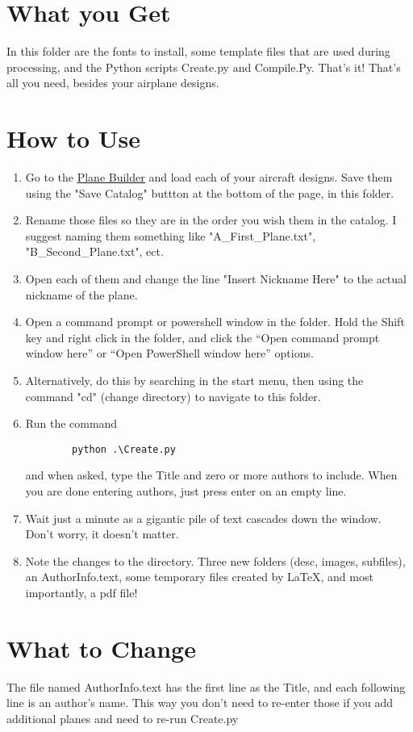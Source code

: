 \documentclass{article}
\begin{document}
\section{What you Get}
In this folder are the fonts to install, some template files that are used during processing, and the Python scripts Create.py and Compile.Py.  That's it!  That's all you need, besides your airplane designs.
\section{How to Use}
\begin{enumerate}
    \item Go to the \href{https://tetragramm.github.io/PlaneBuilder/index.html}{\color{blue}\underline{Plane Builder}} and load each of your aircraft designs.  Save them using the "Save Catalog" buttton at the bottom of the page, in this folder.
    \item Rename those files so they are in the order you wish them in the catalog.  I suggest naming them something like "A\_First\_Plane.txt", "B\_Second\_Plane.txt", ect.
    \item Open each of them and change the line "Insert Nickname Here" to the actual nickname of the plane.
    \item Open a command prompt or powershell window in the folder.  Hold the Shift key and right click in the folder, and click the ``Open command prompt window here'' or ``Open PowerShell window here'' options.
    \item Alternatively, do this by searching in the start menu, then using the command "cd" (change directory) to navigate to this folder.
    \item Run the command \begin{verbatim}
        python .\Create.py
    \end{verbatim} and when asked, type the Title and zero or more authors to include. When you are done entering authors, just press enter on an empty line.
    \item Wait just a minute as a gigantic pile of text cascades down the window.  Don't worry, it doesn't matter.
    \item Note the changes to the directory.  Three new folders (desc, images, subfiles), an AuthorInfo.text, some temporary files created by \LaTeX, and most importantly, a pdf file!
\end{enumerate}

\section{What to Change}
The file named AuthorInfo.text has the first line as the Title, and each following line is an author's name.  This way you don't need to re-enter those if you add additional planes and need to re-run Create.py
\end{document}
